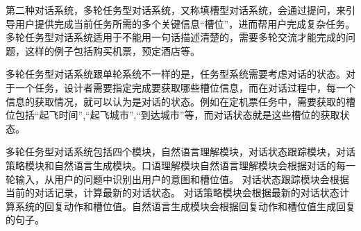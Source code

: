 第二种对话系统，多轮任务型对话系统\cite{young2013pomdp}，又称填槽型对话系统，会通过提问，来引导用户提供完成当前任务所需的多个关键信息``槽位''，进而帮用户完成复杂任务。
多轮任务型对话系统适用于不能用一句话描述清楚的，需要多轮交流才能完成的问题，这样的例子包括购买机票，预定酒店等。

多轮任务型对话系统跟单轮系统不一样的是，任务型系统需要考虑对话的状态。对于一个任务，设计者需要指定完成要获取哪些槽位信息，而在对话过程中，每一个信息的获取情况，就可以认为是对话的状态。例如在定机票任务中，需要获取的槽位包括``起飞时间'',``起飞城市'',``到达城市''等，而对话状态就是这些槽位的获取状态。

多轮任务型对话系统包括四个模块，自然语言理解模块，对话状态跟踪模块，对话策略模块和自然语言生成模块。口语理解模块自然语言理解模块会根据对话的每一轮输入，从用户的问题中识别出用户的意图和槽位值。
对话状态跟踪模块会根据当前的对话记录，计算最新的对话状态。 对话策略模块会根据最新的对话状态计算系统的回复动作和槽位值。自然语言生成模块会根据回复动作和槽位值生成回复的句子。

